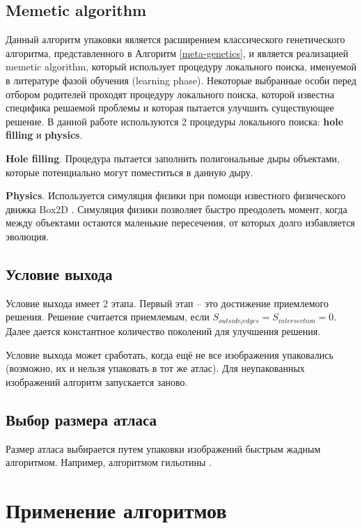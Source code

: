 \documentclass{fefu_thesis/cls/fefu}
\newcommand*\talgref[1]{Алгоритм \ref{#1}}
\begin{document}
    \subsection{Memetic algorithm}

    Данный алгоритм упаковки является расширением классического генетического алгоритма, представленного в \talgref{meta-genetics}, и является реализацией memetic algorithm, который использует процедуру локального поиска, именуемой в литературе фазой обучения (learning phase). Некоторые выбранные особи перед отбором родителей проходят процедуру локального поиска, которой известна специфика решаемой проблемы и которая пытается улучшить существующее решение. В данной работе используются 2 процедуры локального поиска: \textbf{hole filling} и \textbf{physics}.

    \textbf{Hole filling}. Процедура пытается заполнить полигональные дыры объектами, которые потенциально могут поместиться в данную дыру.

    \textbf{Physics}. Используется симуляция физики при помощи известного физического движка Box2D \cite{Box2D}. Симуляция физики позволяет быстро преодолеть момент, когда между объектами остаются маленькие пересечения, от которых долго избавляется эволюция.

    \subsection{Условие выхода}
    Условие выхода имеет 2 этапа. Первый этап -- это достижение приемлемого решения. Решение считается приемлемым, если $S_{outside_ledges} = S_{intersection} = 0$. Далее дается константное количество поколений для улучшения решения.

    Условие выхода может сработать, когда ещё не все изображения упаковались (возможно, их и нельзя упаковать в тот же атлас). Для неупакованных изображений алгоритм запускается заново.

    \subsection{Выбор размера атласа}

    Размер атласа выбирается путем упаковки изображений быстрым жадным алгоритмом. Например, алгоритмом гильотины \cite{ThousandWayToPackBin}.
    \pagebreak
    \section{Применение алгоритмов}
\end{document}
